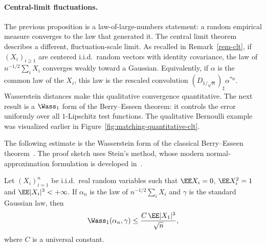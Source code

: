 \paragraph{Central-limit fluctuations.}
The previous proposition is a law-of-large-numbers statement: a random empirical measure converges to the law that generated it. The central limit theorem describes a different, fluctuation-scale limit. As recalled in Remark~\ref{rem-clt}, if \((X_i)_{i\geq1}\) are centered i.i.d.\ random vectors with identity covariance, the law of \(n^{-1/2}\sum_i X_i\) converges weakly toward a Gaussian. Equivalently, if \(\alpha\) is the common law of the \(X_i\), this law is the rescaled convolution \((D_{1/\sqrt n})_\sharp\alpha^{*n}\). Wasserstein distances make this qualitative convergence quantitative. The next result is a \(\Wass_1\) form of the Berry--Esseen theorem: it controls the error uniformly over all \(1\)-Lipschitz test functions. The qualitative Bernoulli example was visualized earlier in Figure~\ref{fig:matching-quantitative-clt}.

The following estimate is the Wasserstein form of the classical Berry--Esseen theorem~\cite{berry1941accuracy,esseen1942liapunoff}. The proof sketch uses Stein's method, whose modern normal-approximation formulation is developed in~\cite{chen2011normal}.

\begin{prop}\label{prop-berry-esseen-w1}
	Let $(X_i)_{i=1}^n$ be i.i.d.\ real random variables such that $\EE X_i=0$, $\EE X_i^2=1$ and $\EE |X_i|^3<+\infty$. If $\alpha_n$ is the law of $n^{-1/2}\sum_i X_i$ and $\gamma$ is the standard Gaussian law, then
	\[
		\Wass_1(\alpha_n,\gamma)
		\leq
		\frac{C\,\EE |X_1|^3}{\sqrt n},
	\]
	where $C$ is a universal constant.
\end{prop}

